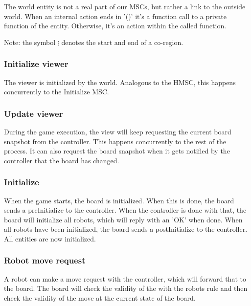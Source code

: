 	The world entity is not a real part of our MSCs, but rather a link to the outside world. When an internal action ends in '()' it's a function call to a private function of the entity. Otherwise, it's an action within the called function.

	Note: the symbol $\vdots$ denotes the start and end of a co-region.

	\subsubsection{Initialize viewer}
	The viewer is initialized by the world. Analogous to the HMSC, this happens concurrently to the Initialize MSC.
	
	

    	\subsubsection{Update viewer}
	During the game execution, the view will keep requesting the current board snapshot from the controller. This happens concurrently to the rest of the process. It can also request the board snapshot when it gets notified by the controller that the board has changed.
    	
	

	\subsubsection{Initialize}
	When the game starts, the board is initialized. When this is done, the board sends a preInitialize to the controller. When the controller is done with that, the board will initialize all robots, which will reply with an 'OK' when done. When all robots have been initialized, the board sends a postInitialize to the controller. All entities are now initialized.
  	
	
    	
	\subsubsection{Robot move request}
	A robot can make a move request with the controller, which will forward that to the board. The board will check the validity of the with the robots rule and then check the validity of the move at the current state of the board.

	

